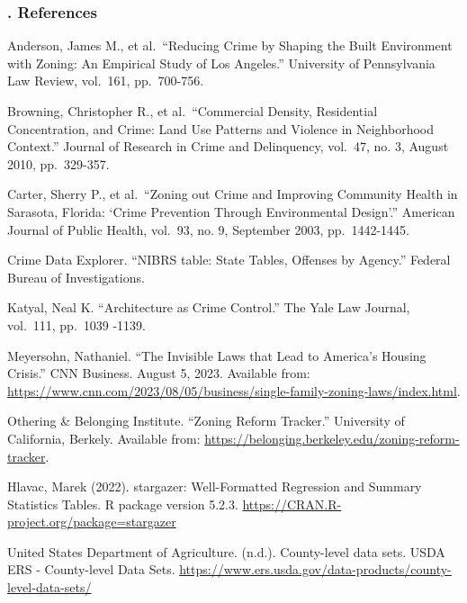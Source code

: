 \documentclass[
  12pt,
]{article}
\begin{document}
\hypertarget{references}{%
\subsubsection{. References}\label{references}}

Anderson, James M., et al.~``Reducing Crime by Shaping the Built
Environment with Zoning: An Empirical Study of Los Angeles.'' University
of Pennsylvania Law Review, vol.~161, pp.~700-756.

Browning, Christopher R., et al.~``Commercial Density, Residential
Concentration, and Crime: Land Use Patterns and Violence in Neighborhood
Context.'' Journal of Research in Crime and Delinquency, vol.~47, no. 3,
August 2010, pp.~329-357.

Carter, Sherry P., et al.~``Zoning out Crime and Improving Community
Health in Sarasota, Florida: `Crime Prevention Through Environmental
Design'.'' American Journal of Public Health, vol.~93, no. 9, September
2003, pp.~1442-1445.

Crime Data Explorer. ``NIBRS table: State Tables, Offenses by Agency.''
Federal Bureau of Investigations.

Katyal, Neal K. ``Architecture as Crime Control.'' The Yale Law Journal,
vol.~111, pp.~1039 -1139.

Meyersohn, Nathaniel. ``The Invisible Laws that Lead to America's
Housing Crisis.'' CNN Business. August 5, 2023. Available from:
\url{https://www.cnn.com/2023/08/05/business/single-family-zoning-laws/index.html}.

Othering \& Belonging Institute. ``Zoning Reform Tracker.'' University
of California, Berkely. Available from:
\url{https://belonging.berkeley.edu/zoning-reform-tracker}.

Hlavac, Marek (2022). stargazer: Well-Formatted Regression and Summary
Statistics Tables. R package version 5.2.3.
\url{https://CRAN.R-project.org/package=stargazer}

United States Department of Agriculture. (n.d.). County-level data sets.
USDA ERS - County-level Data Sets.
\url{https://www.ers.usda.gov/data-products/county-level-data-sets/}
\end{document}
